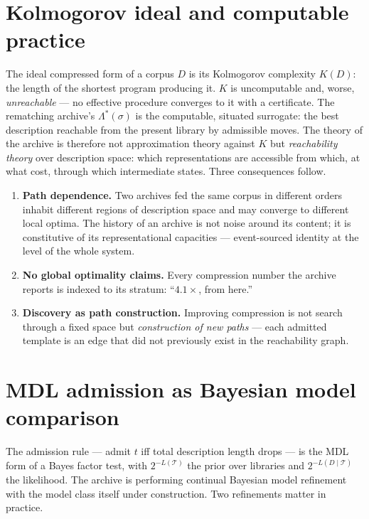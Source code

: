 \documentclass[11pt,oneside]{book}
\theoremstyle{remark}
\newcommand{\Tem}{\mathcal{T}}
\newcommand{\Kol}{K}
\begin{document}
\section{Kolmogorov ideal and computable practice}

The ideal compressed form of a corpus $D$ is its Kolmogorov complexity
$\Kol(D)$: the length of the shortest program producing it. $\Kol$ is
uncomputable and, worse, \emph{unreachable} --- no effective procedure
converges to it with a certificate. The rematching archive's
$\Lambda^\ast(\sigma)$ is the computable, situated surrogate: the best
description reachable from the present library by admissible moves. The
theory of the archive is therefore not approximation theory against
$\Kol$ but \emph{reachability theory} over description space: which
representations are accessible from which, at what cost, through which
intermediate states. Three consequences follow.

\begin{enumerate}[leftmargin=2em]
\item \textbf{Path dependence.} Two archives fed the same corpus in
different orders inhabit different regions of description space and may
converge to different local optima. The history of an archive is not
noise around its content; it is constitutive of its representational
capacities --- event-sourced identity at the level of the whole system.
\item \textbf{No global optimality claims.} Every compression number the
archive reports is indexed to its stratum: ``$4.1\times$, from here.''
\item \textbf{Discovery as path construction.} Improving compression is
not search through a fixed space but \emph{construction of new paths} ---
each admitted template is an edge that did not previously exist in the
reachability graph.
\end{enumerate}

\section{MDL admission as Bayesian model comparison}

The admission rule --- admit $t$ iff total description length drops ---
is the MDL form of a Bayes factor test, with $2^{-L(\Tem)}$ the prior
over libraries and $2^{-L(D \mid \Tem)}$ the likelihood. The archive is
performing continual Bayesian model refinement with the model class
itself under construction. Two refinements matter in practice.
\end{document}
